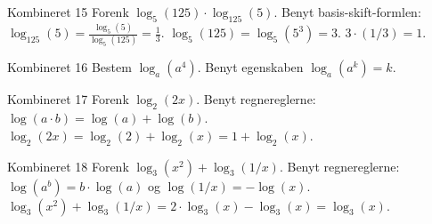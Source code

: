 \documentclass{article}
\begin{document}
\newpage

\begin{exercise}{Kombineret 15}
Forenk $\log_5(125) \cdot \log_{125}(5)$. 
\hint
Benyt basis-skift-formlen: $\log_{125}(5) = \frac{\log_5(5)}{\log_5(125)} = \frac{1}{3}$.
\hint
$\log_5(125) = \log_5(5^3) = 3$.
\hint
$3 \cdot (1/3) = 1$.
\end{exercise}

\newpage

\begin{exercise}{Kombineret 16}
Bestem $\log_{a}(a^4)$. 
\hint
Benyt egenskaben $\log_a(a^k) = k$.
\end{exercise}

\newpage

\begin{exercise}{Kombineret 17}
Forenk $\log_{2}(2x)$. 
\hint
Benyt regnereglerne: $\log(a \cdot b) = \log(a) + \log(b)$.
\hint
$\log_2(2x) = \log_2(2) + \log_2(x) = 1 + \log_2(x)$.
\end{exercise}

\newpage

\begin{exercise}{Kombineret 18}
Forenk $\log_3(x^2) + \log_3(1/x)$. 
\hint
Benyt regnereglerne: $\log(a^b) = b \cdot \log(a)$ og $\log(1/x) = -\log(x)$.
\hint
$\log_3(x^2) + \log_3(1/x) = 2 \cdot \log_3(x) - \log_3(x) = \log_3(x)$.
\end{exercise}

\newpage
\end{document}
